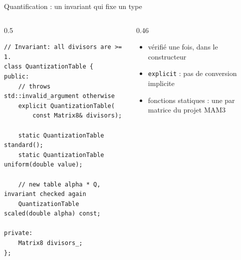 \documentclass[aspectratio=169,10pt]{beamer}
\newcommand{\speaker}{}
\newcommand{\code}[1]{\texttt{#1}}
\begin{document}
\begin{frame}[fragile]{Quantification : un invariant qui fixe un type}
  \begin{columns}[T]
    \begin{column}{0.5\textwidth}
\begin{lstlisting}
// Invariant: all divisors are >= 1.
class QuantizationTable {
public:
    // throws std::invalid_argument otherwise
    explicit QuantizationTable(
        const Matrix8& divisors);

    static QuantizationTable standard();
    static QuantizationTable uniform(double value);

    // new table alpha * Q, invariant checked again
    QuantizationTable scaled(double alpha) const;

private:
    Matrix8 divisors_;
};
\end{lstlisting}
    \end{column}
    \begin{column}{0.46\textwidth}
      \centering

      \vspace{0.6em}
      \raggedright
      \begin{itemize}
        \item vérifié une fois, dans le constructeur
        \item \code{explicit} : pas de conversion implicite
        \item fonctions statiques : une par matrice du projet MAM3
      \end{itemize}
    \end{column}
  \end{columns}
\end{frame}

\renewcommand{\speaker}{Karim}
\end{document}
